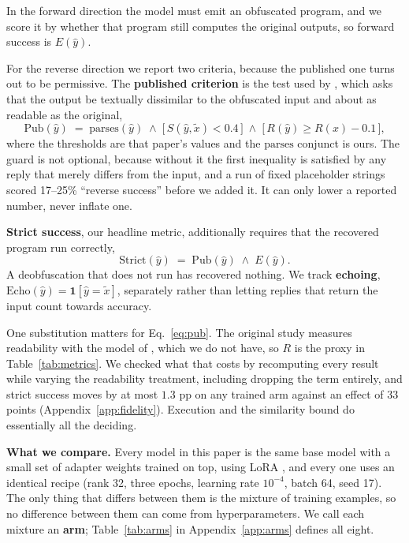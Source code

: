 \documentclass{article}
\begin{document}
In the forward direction the model must emit an obfuscated program, and we score it by
whether that program still computes the original outputs, so forward success is $E(\hat y)$.

For the reverse direction we report two criteria, because the published one turns out to be
permissive. The \textbf{published criterion} is the test used by
\citet{nikiema2025contrastive}, which asks that the output be textually dissimilar to the
obfuscated input and about as readable as the original,
\begin{equation}
\mathrm{Pub}(\hat y) \;=\; \mathrm{parses}(\hat y) \;\wedge\;
\big[\,S(\hat y,\tilde x) < 0.4\,\big] \;\wedge\;
\big[\,R(\hat y) \ge R(x) - 0.1\,\big],
\label{eq:pub}
\end{equation}
where the thresholds are that paper's values and the $\mathrm{parses}$ conjunct is ours. The
guard is not optional, because without it the first inequality is satisfied by any reply that
merely differs from the input, and a run of fixed placeholder strings scored 17--25\% ``reverse
success'' before we added it. It can only lower a reported number, never inflate one.

\textbf{Strict success}, our headline metric, additionally requires that the recovered program
run correctly,
\begin{equation}
\mathrm{Strict}(\hat y) \;=\; \mathrm{Pub}(\hat y) \;\wedge\; E(\hat y).
\label{eq:strict}
\end{equation}
A deobfuscation that does not run has recovered nothing. We track \textbf{echoing},
$\mathrm{Echo}(\hat y)=\mathbf{1}[\hat y = \tilde x]$, separately rather than letting replies
that return the input count towards accuracy.

One substitution matters for Eq.~\eqref{eq:pub}. The original study measures readability with
the model of \citet{scalabrino2018comprehension}, which we do not have, so $R$ is the proxy in
Table~\ref{tab:metrics}. We checked what that costs by recomputing every result while varying
the readability treatment, including dropping the term entirely, and strict success moves by
at most $1.3$ pp on any trained arm against an effect of 33 points
(Appendix~\ref{app:fidelity}). Execution and the similarity bound do essentially all the
deciding.

\textbf{What we compare.} Every model in this paper is the same base model with a small
set of adapter weights trained on top, using LoRA \citep{hu2022lora}, and every one uses an
identical recipe (rank 32, three epochs, learning rate $10^{-4}$, batch 64, seed 17). The
only thing that differs between them is the mixture of training examples, so no difference
between them can come from hyperparameters. We call each mixture an \textbf{arm};
Table~\ref{tab:arms} in Appendix~\ref{app:arms} defines all eight.
\end{document}

